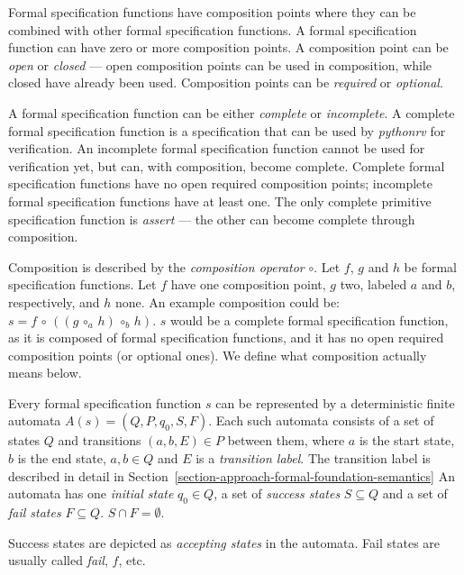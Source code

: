 Formal specification functions have composition points where they can be
combined with other formal specification functions. A formal specification
function can have zero or more composition points. A composition point can be
\textit{open} or \textit{closed} --- open composition points can be used in
composition, while closed have already been used. Composition points can be
\textit{required} or \textit{optional}.

A formal specification function can be either \textit{complete} or
\textit{incomplete}. A complete formal specification function is a
specification that can be used by \textit{pythonrv} for verification. An
incomplete formal specification function cannot be used for verification yet,
but can, with composition, become complete. Complete formal specification
functions have no open required composition points; incomplete formal
specification functions have at least one. The only complete primitive
specification function is \textit{assert} --- the other can become complete
through composition.

\begin{mydef}\label{def-composition-operator}
Composition is described by the \textit{composition operator} $\circ$. Let $f$,
$g$ and $h$ be formal specification functions. Let $f$ have one composition
point, $g$ two, labeled $a$ and $b$, respectively, and $h$ none. An example
composition could be: $s = f \, \circ \, ((g \, \circ_{a} \, h) \, \circ_{b} \,
h)$. $s$ would be a complete formal specification function, as it is composed
of formal specification functions, and it has no open required composition
points (or optional ones). We define what composition actually means below.
\end{mydef}

\begin{mydef}[automata]\label{def-automata}
Every formal specification function $s$ can be represented by a deterministic
finite automata $A(s) = (Q, P, q_0, S, F)$. Each such automata consists of a
set of states $Q$ and transitions $(a, b, E) \in P$ between them, where $a$ is
the start state, $b$ is the end state, $a,b \in Q$ and $E$ is a
\textit{transition label}. The transition label is described in detail in
Section~\ref{section-approach-formal-foundation-semantics} An automata has one
\textit{initial state} $q_0 \in Q$, a set of \textit{success states} $S
\subseteq Q$ and a set of \textit{fail states} $F \subseteq Q$. $S \cap F =
\emptyset$.

Success states are depicted as \textit{accepting states} in the automata. Fail
states are usually called \textit{fail}, $f$, etc.
\end{mydef}

